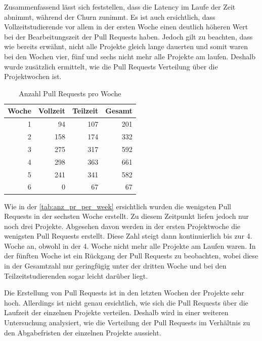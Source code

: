 Zusammenfassend lässt sich feststellen, dass die Latency im Laufe der Zeit abnimmt, während der Churn zunimmt. Es ist auch ersichtlich, dass Vollzeitstudierende vor allem in der ersten Woche einen deutlich höheren Wert bei der Bearbeitungszeit der Pull Requests haben. Jedoch gilt zu beachten, dass wie bereits erwähnt, nicht alle Projekte gleich lange dauerten und somit waren bei den Wochen vier, fünf und sechs nicht mehr alle Projekte am laufen. Deshalb wurde zusätzlich ermittelt, wie die Pull Requests Verteilung über die Projektwochen ist.

\begin{table}[ht]
\caption{Anzahl Pull Requests pro Woche}
\label{tab:anz_pr_per_week}
\centering
\begin{tabular}{rrrr}
\toprule
\textbf{Woche} & \textbf{Vollzeit} & \textbf{Teilzeit} & \textbf{Gesamt} \\
\midrule
1 & 94 & 107 & 201 \\
2 & 158 & 174 & 332\\
3 & 275 & 317 & 592\\
4 & 298 & 363 & 661\\
5 & 241 & 341 & 582 \\
6 & 0 & 67 & 67\\
\bottomrule
\end{tabular}
\end{table}

\newpage
Wie in der \autoref{tab:anz_pr_per_week} ersichtlich wurden die wenigsten Pull Requests in der sechsten Woche erstellt. Zu diesem Zeitpunkt liefen jedoch nur noch drei Projekte. Abgesehen davon werden in der ersten Projektwoche die wenigsten Pull Requests erstellt. Diese Zahl steigt dann kontinuierlich bis zur 4. Woche an, obwohl in der 4. Woche nicht mehr alle Projekte am Laufen waren. In der fünften Woche ist ein Rückgang der Pull Requests zu beobachten, wobei diese in der Gesamtzahl nur geringfügig unter der dritten Woche und bei den Teilzeitstudierenden sogar leicht darüber liegt. 

Die Erstellung von Pull Requests ist in den letzten Wochen der Projekte sehr hoch. Allerdings ist nicht genau ersichtlich, wie sich die Pull Requests über die Laufzeit der einzelnen Projekte verteilen. Deshalb wird in einer weiteren Untersuchung analysiert, wie die Verteilung der Pull Requests im Verhältnis zu den Abgabefristen der einzelnen Projekte aussieht.


